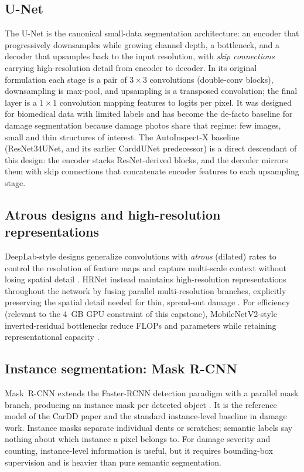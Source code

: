 \documentclass[conference]{IEEEtran}
\begin{document}
\subsection{U-Net}
The U-Net \cite{unet2015} is the canonical small-data segmentation architecture:
an encoder that progressively downsamples while growing channel depth, a
bottleneck, and a decoder that upsamples back to the input resolution, with
\emph{skip connections} carrying high-resolution detail from encoder to decoder.
In its original formulation each stage is a pair of $3\times3$ convolutions
(double-conv blocks), downsampling is max-pool, and upsampling is a transposed
convolution; the final layer is a $1\times1$ convolution mapping features to logits
per pixel. It was designed for biomedical data with limited labels and has become
the de-facto baseline for damage segmentation because damage photos share that
regime: few images, small and thin structures of interest. The AutoInspect-X
baseline (ResNet34UNet, and its earlier CarddUNet predecessor) is a direct
descendant of this design: the encoder stacks ResNet-derived blocks, and the
decoder mirrors them with skip connections that concatenate encoder features to
each upsampling stage.

\subsection{Atrous designs and high-resolution representations}
DeepLab-style designs generalize convolutions with \emph{atrous} (dilated)
rates to control the resolution of feature maps and capture multi-scale context
without losing spatial detail \cite{deeplabv3}. HRNet instead maintains
high-resolution representations throughout the network by fusing parallel
multi-resolution branches, explicitly preserving the spatial detail needed for
thin, spread-out damage \cite{hrnet2020}. For efficiency (relevant to the 4~GB
GPU constraint of this capstone), MobileNetV2-style inverted-residual bottlenecks
reduce FLOPs and parameters while retaining representational capacity
\cite{mobilenetv2}.

\subsection{Instance segmentation: Mask R-CNN}
Mask~R-CNN extends the Faster-RCNN detection paradigm with a parallel mask
branch, producing an instance mask per detected object \cite{maskrcnn2017}. It is
the reference model of the CarDD paper \cite{cardd2023} and the standard
instance-level baseline in damage work. Instance masks separate individual dents
or scratches; semantic labels say nothing about which instance a pixel belongs
to. For damage severity and counting, instance-level information is useful, but
it requires bounding-box supervision and is heavier than pure semantic
segmentation.
\end{document}
